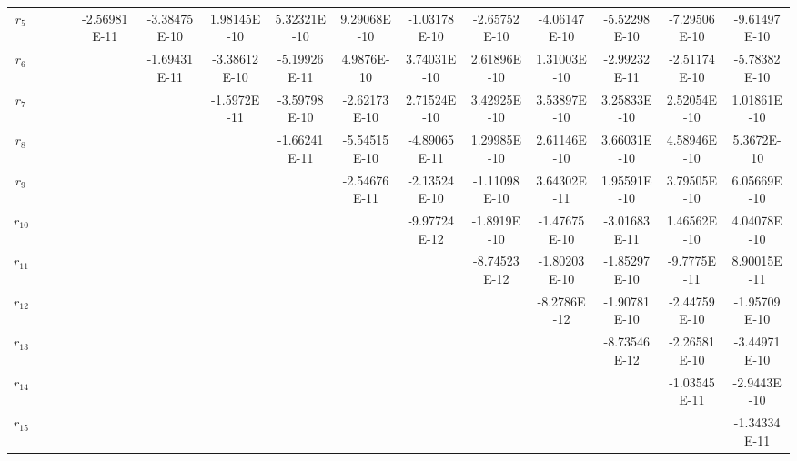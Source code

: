 \documentclass[a4paper]{article}
\begin{document}
\begin{CJK*}{GBK}{song}
\begin{center}
\begin{table*}[!htbp]
{\begin{threeparttable}[!htpb]
\begin{tabular}{ccccc ccccc ccccc}
$r_{5}$	&		&		&		&	-2.56981E-11	&	-3.38475E-10	&	1.98145E-10	&	5.32321E-10	&	9.29068E-10	&	-1.03178E-10	&	-2.65752E-10	&	-4.06147E-10	&	-5.52298E-10	&	-7.29506E-10	&	-9.61497E-10	\\
$r_{6}$	&		&		&		&		&	-1.69431E-11	&	-3.38612E-10	&	-5.19926E-11	&	4.9876E-10	&	3.74031E-10	&	2.61896E-10	&	1.31003E-10	&	-2.99232E-11	&	-2.51174E-10	&	-5.78382E-10	\\
$r_{7}$	&		&		&		&		&		&	-1.5972E-11	&	-3.59798E-10	&	-2.62173E-10	&	2.71524E-10	&	3.42925E-10	&	3.53897E-10	&	3.25833E-10	&	2.52054E-10	&	1.01861E-10	\\
$r_{8}$	&		&		&		&		&		&		&	-1.66241E-11	&	-5.54515E-10	&	-4.89065E-11	&	1.29985E-10	&	2.61146E-10	&	3.66031E-10	&	4.58946E-10	&	5.3672E-10	\\
$r_{9}$	&		&		&		&		&		&		&		&	-2.54676E-11	&	-2.13524E-10	&	-1.11098E-10	&	3.64302E-11	&	1.95591E-10	&	3.79505E-10	&	6.05669E-10	\\
$r_{10}$	&		&		&		&		&		&		&		&		&	-9.97724E-12	&	-1.8919E-10	&	-1.47675E-10	&	-3.01683E-11	&	1.46562E-10	&	4.04078E-10	\\
$r_{11}$	&		&		&		&		&		&		&		&		&		&	-8.74523E-12	&	-1.80203E-10	&	-1.85297E-10	&	-9.7775E-11	&	8.90015E-11	\\
$r_{12}$	&		&		&		&		&		&		&		&		&		&		&	-8.2786E-12	&	-1.90781E-10	&	-2.44759E-10	&	-1.95709E-10	\\
$r_{13}$	&		&		&		&		&		&		&		&		&		&		&		&	-8.73546E-12	&	-2.26581E-10	&	-3.44971E-10	\\
$r_{14}$	&		&		&		&		&		&		&		&		&		&		&		&		&	-1.03545E-11	&	-2.9443E-10	\\
$r_{15}$	&		&		&		&		&		&		&		&		&		&		&		&		&		&	-1.34334E-11	\\
\bottomrule
\end{tabular}
\end{threeparttable}}%
\end{table*}
\end{center}


\end{CJK*}
\end{document}
